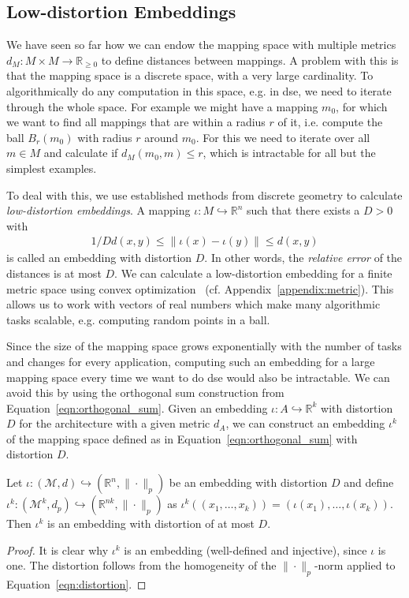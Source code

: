 \subsection{Low-distortion Embeddings}

We have seen so far how we can endow the mapping space with multiple metrics $d_M : M \times M \rightarrow \mathbb{R}_{\geq 0}$ to define distances between mappings.
A problem with this is that the mapping space is a discrete space, with a very large cardinality.
To algorithmically do any computation in this space, e.g. in \ac{dse}, we need to iterate through the whole space.
For example we might have a mapping $m_0$, for which we want to find all mappings that are within a radius $r$ of it, i.e. compute the ball $B_r(m_0)$ with radius $r$ around $m_0$.
For this we need to iterate over all $m \in M$ and calculate if $d_M(m_0,m) \leq r$, which is intractable for all but the simplest examples.

To deal with this, we use established methods from discrete geometry to calculate \emph{low-distortion embeddings}.
A mapping $\iota : M \hookrightarrow \mathbb{R}^n$ such that there exists a $D > 0$ with
\begin{align}\label{eqn:distortion} 1/D d(x,y) \leq \| \iota(x) - \iota(y) \| \leq d(x,y) \end{align}
is called an embedding with distortion $D$.
In other words, the \emph{relative error} of the distances is at most $D$.
We can calculate a low-distortion embedding for a finite metric space using convex optimization~\cite{matouvsek} (cf. Appendix~\ref{appendix:metric}).
This allows us to work with vectors of real numbers which make many algorithmic tasks scalable, e.g. computing random points in a ball.

Since the size of the mapping space grows exponentially with the number of tasks and changes for every application, computing such an embedding for a large mapping space every time we want to do \ac{dse} would also be intractable.
We can avoid this by using the orthogonal sum construction from Equation~\ref{eqn:orthogonal_sum}.
Given an embedding $\iota : A \hookrightarrow \mathbb{R}^k$ with distortion $D$ for the architecture with a given metric $d_A$, we can construct an embedding $\iota^k$ of the mapping space defined as in Equation~\ref{eqn:orthogonal_sum} with distortion $D$.
\begin{theorem}
\label{thm:iotad}
Let $\iota: (\mathcal{M}, d) \hookrightarrow (\mathbb{R}^n, \| \cdot \|_p)$ be an embedding with distortion $D$ and define $\iota^{k} : (\mathcal{M}^k,d_p) \hookrightarrow (\mathbb{R}^{nk}, \| \cdot \|_p)$ as
$\iota^k ( (x_1,\ldots,x_k)) = (\iota(x_1),\ldots,\iota(x_k))$. Then $\iota^k$ is an embedding with distortion of at most $D$.
\begin{proof}
It is clear why $\iota^k$ is an embedding (well-defined and injective), since $\iota$ is one.
The distortion follows from the homogeneity of the $\| \cdot \|_p$-norm applied to Equation~\ref{eqn:distortion}.
\end{proof}
\end{theorem}
	  
